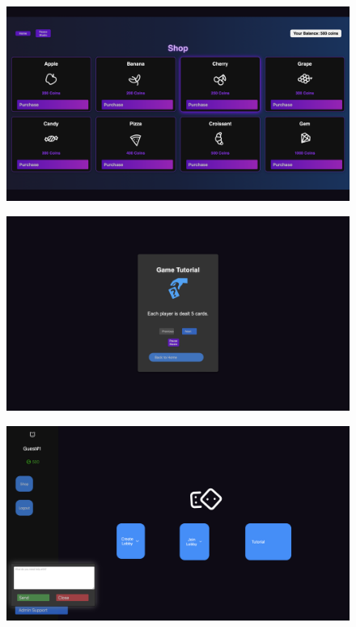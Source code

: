 \begin{figure}[h!]
\centering
\includegraphics[width=1\linewidth]{UI Screenshot 4.png}
\label{fig:ui4}
\end{figure}

\begin{figure}[h!]
\centering
\includegraphics[width=1\linewidth]{UI Screenshot 5.png}
\label{fig:ui5}
\end{figure}

\begin{figure}[h!]
\centering
\includegraphics[width=1\linewidth]{UI Screenshot 6.png}
\label{fig:ui6}
\end{figure}

